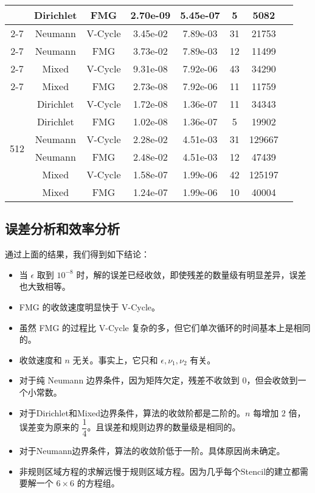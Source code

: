 \documentclass{ctexart}
\begin{document}
\begin{longtable}{cccccccc}
	\multirow{6}{*}{}		& Dirichlet	& FMG		& 2.70e-09	& 5.45e-07	& 5		& 5082		\\ \cline{2-7}
	\multirow{6}{*}{}		& Neumann	& V-Cycle	& 3.45e-02	& 7.89e-03	& 31	& 21753		\\ \cline{2-7}
	\multirow{6}{*}{}		& Neumann	& FMG		& 3.73e-02	& 7.89e-03	& 12	& 11499		\\ \cline{2-7}
	\multirow{6}{*}{}		& Mixed		& V-Cycle	& 9.31e-08	& 7.92e-06	& 43	& 34290		\\ \cline{2-7}
	\multirow{6}{*}{}		& Mixed		& FMG		& 2.73e-08	& 7.92e-06	& 11	& 11759		\\ \hline
	\multirow{6}{*}{512}	& Dirichlet	& V-Cycle	& 1.72e-08	& 1.36e-07	& 11	& 34343		\\ \cline{2-7}
	\multirow{6}{*}{}		& Dirichlet	& FMG		& 1.02e-08	& 1.36e-07	& 5		& 19902		\\ \cline{2-7}
	\multirow{6}{*}{}		& Neumann	& V-Cycle	& 2.28e-02	& 4.51e-03	& 31	& 129667	\\ \cline{2-7}
	\multirow{6}{*}{}		& Neumann	& FMG		& 2.48e-02	& 4.51e-03	& 12	& 47439		\\ \cline{2-7}
	\multirow{6}{*}{}		& Mixed		& V-Cycle	& 1.58e-07	& 1.99e-06	& 42	& 125197	\\ \cline{2-7}
	\multirow{6}{*}{}		& Mixed		& FMG		& 1.24e-07	& 1.99e-06	& 10	& 40004		\\ \hline
\end{longtable}

\subsection{误差分析和效率分析}

通过上面的结果，我们得到如下结论：

\begin{itemize}
	\item 当 $\epsilon$ 取到 $10^{-8}$ 时，解的误差已经收敛，即使残差的数量级有明显差异，误差也大致相等。
	\item FMG 的收敛速度明显快于 V-Cycle。
	\item 虽然 FMG 的过程比 V-Cycle 复杂的多，但它们单次循环的时间基本上是相同的。
	\item 收敛速度和 $n$ 无关。事实上，它只和 $\epsilon,\nu_1,\nu_2$ 有关。
	\item 对于纯 Neumann 边界条件，因为矩阵欠定，残差不收敛到 $0$，但会收敛到一个小常数。
	\item 对于Dirichlet和Mixed边界条件，算法的收敛阶都是二阶的。$n$ 每增加 $2$ 倍，误差变为原来的 $\dfrac 14$。且误差和规则边界的数量级是相同的。
	\item 对于Neumann边界条件，算法的收敛阶低于一阶。具体原因尚未确定。
	\item 非规则区域方程的求解远慢于规则区域方程。因为几乎每个Stencil的建立都需要解一个 $6\times 6$ 的方程组。
\end{itemize}
\end{document}
